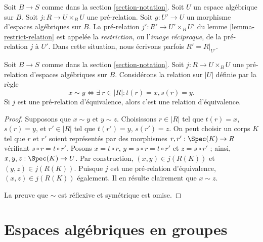 \begin{definition}
\label{definition-restrict-relation}
Soit $B \to S$ comme dans la section \ref{section-notation}. Soit $U$ un espace algébrique sur $B$. Soit $j : R \to U \times_B U$ une pré-relation. Soit $g : U' \to U$ un morphisme d'espaces algébriques sur $B$. La pré-relation $j' : R' \to U' \times_B U'$ du lemme \ref{lemma-restrict-relation} est appelée la {\it restriction}, ou l'{\it image réciproque}, de la pré-relation $j$ à $U'$. Dans cette situation, nous écrivons parfois $R' = R|_{U'}$.
\end{definition}

\begin{lemma}
\label{lemma-pre-equivalence-equivalence-relation-points}
Soit $B \to S$ comme dans la section \ref{section-notation}. Soit $j : R \to U \times_B U$ une pré-relation d'espaces algébriques sur $B$. Considérons la relation sur $|U|$ définie par la règle
$$
x \sim y
\Leftrightarrow
\exists\ r \in |R| :
t(r) = x,
s(r) = y.
$$
Si $j$ est une pré-relation d'équivalence, alors c'est une relation d'équivalence.
\end{lemma}

\begin{proof}
Supposons que $x \sim y$ et $y \sim z$. Choisissons $r \in |R|$ tel que $t(r) = x$, $s(r) = y$, et $r' \in |R|$ tel que $t(r') = y$, $s(r') = z$. On peut choisir un corps $K$ tel que $r$ et $r'$ soient représentés par des morphismes $r, r' : \Spec(K) \to R$ vérifiant $s \circ r = t \circ r'$. Posons $x = t \circ r$, $y = s \circ r = t \circ r'$ et $z = s \circ r'$ ; ainsi, $x, y, z : \Spec(K) \to U$. Par construction, $(x, y) \in j(R(K))$ et $(y, z) \in j(R(K))$. Puisque $j$ est une pré-relation d'équivalence, $(x, z) \in j(R(K))$ également. Il en résulte clairement que $x \sim z$.

\medskip\noindent
La preuve que $\sim$ est réflexive et symétrique est omise.
\end{proof}















\section{Espaces algébriques en groupes}
\label{section-group-spaces}

